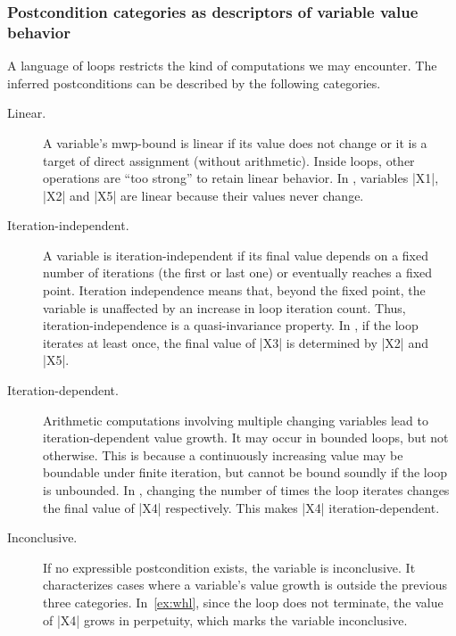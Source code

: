 \subsubsection{Postcondition categories as descriptors of variable value behavior}
\label{subsec:disclaimer}

A language of loops restricts the kind of computations we may encounter.
The inferred postconditions can be described by the following categories.

\begin{description}

    \item[Linear.]
    A variable's mwp-bound is linear if its value does not change or it is a target of direct assignment (without arithmetic).
    Inside loops, other operations are \enquote{too strong} to retain linear behavior.
    In \exname, variables \pr|X1|, \pr|X2| and \pr|X5| are linear because their values never change.

    \item[Iteration-independent.]
    A variable is iteration-independent if its final value depends on a fixed number of iterations (\eg the first or last one) or eventually reaches a fixed point.
    Iteration independence means that, beyond the fixed point, the variable is unaffected by an increase in loop iteration count.
    Thus, iteration-independence is a quasi-invariance property.
    In \exname, if the loop iterates at least once, the final value of \pr|X3| is determined by \pr|X2| and \pr|X5|.

    \item[Iteration-dependent.]
    Arithmetic computations involving multiple changing variables lead to iteration-dependent value growth.
    It may occur in bounded loops, but not otherwise.
    This is because a continuously increasing value may be boundable under finite iteration, but cannot be bound soundly if the loop is unbounded.
    In \explain, changing the number of times the loop iterates changes the final value of \pr|X4| respectively.
    This makes \pr|X4| iteration-dependent.

    \item[Inconclusive.]
    If no expressible postcondition exists, the variable is inconclusive.
    It characterizes cases where a variable's value growth is outside the previous three categories.
    In~\autoref{ex:whl}, since the loop does not terminate, the value of \pr|X4| grows in perpetuity, which marks the variable inconclusive.

\end{description}

